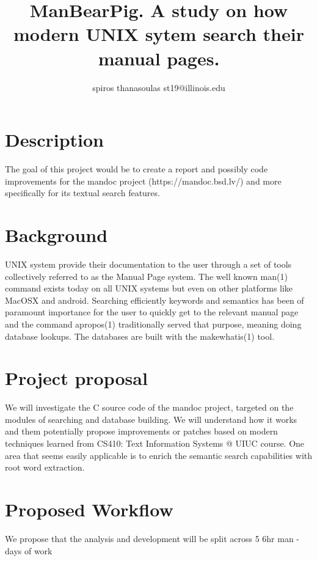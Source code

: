 \documentclass{report}
\begin{document}
\title{ManBearPig. A study on how modern UNIX sytem search their manual pages.}
\author{spiros thanasoulas st19@illinois.edu}
\maketitle

\section*{Description}
The goal of this project would be to create a report and possibly code improvements
for the mandoc project (https://mandoc.bsd.lv/) and more specifically for its textual 
search features.

\section*{Background}
UNIX system provide their documentation to the user through a set of tools collectively referred to
as the Manual Page system. The well known man(1) command exists today on all UNIX systems but even
on other platforms like MacOSX and android. Searching efficiently keywords and semantics has been
of paramount importance for the user to quickly get to the relevant manual page and the command
apropos(1) traditionally served that purpose, meaning doing database lookups. 
The databases are built with the makewhatis(1) tool.

\section*{Project proposal}
We will investigate the C source code of the mandoc project, targeted on the modules of searching
and database building. We will understand how it works and them potentially propose improvements
or patches based on modern techniques learned from CS410: Text Information Systems @ UIUC course.
One area that seems easily applicable is to enrich the semantic search capabilities with root word extraction.


\section*{Proposed Workflow}
We propose that the analysis and development will be split across 5 6hr man - days of work
\end{document}
